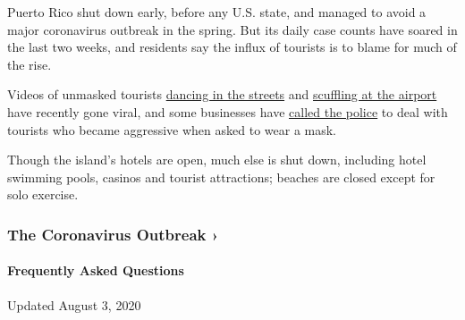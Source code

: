 Puerto Rico shut down early, before any U.S. state, and managed to avoid
a major coronavirus outbreak in the spring. But its daily case counts
have soared in the last two weeks, and residents say the influx of
tourists is to blame for much of the rise.

Videos of unmasked tourists
\href{https://www.telemundopr.com/noticias/puerto-rico/sin-mascarilla-y-distanciamiento-decenas-de-turistas-por-la-libre-en-condado/2105861/}{dancing
in the streets} and
\href{https://www.facebookcorewwwi.onion/100000978562895/videos/4176373252405252/}{scuffling
at the airport} have recently gone viral, and some businesses have
\href{https://www.telemundopr.com/noticias/puerto-rico/sin-mascarilla-y-distanciamiento-decenas-de-turistas-por-la-libre-en-condado/2105861/}{called
the police} to deal with tourists who became aggressive when asked to
wear a mask.

Though the island's hotels are open, much else is shut down, including
hotel swimming pools, casinos and tourist attractions; beaches are
closed except for solo exercise.

\href{https://www.nytimes3xbfgragh.onion/news-event/coronavirus?action=click\&pgtype=Article\&state=default\&region=MAIN_CONTENT_3\&context=storylines_faq}{}

\hypertarget{the-coronavirus-outbreak-}{%
\subsubsection{The Coronavirus Outbreak
›}\label{the-coronavirus-outbreak-}}

\hypertarget{frequently-asked-questions}{%
\paragraph{Frequently Asked
Questions}\label{frequently-asked-questions}}

Updated August 3, 2020

